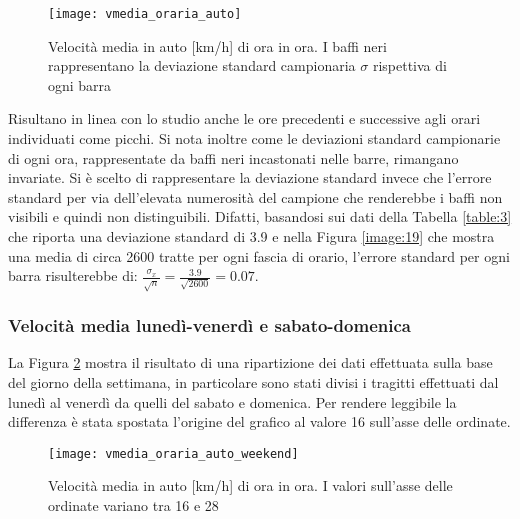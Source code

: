 \begin{figure}[H]
	\centering
	\texttt{[image: vmedia\_oraria\_auto]}
	\caption{Velocità media in auto [km/h] di ora in ora. I baffi neri rappresentano la deviazione standard campionaria $\sigma$ rispettiva di ogni barra}
	\label{image:3}
\end{figure}

Risultano in linea con lo studio anche le ore precedenti e successive agli orari individuati come picchi. Si nota inoltre come le deviazioni standard campionarie di ogni ora, rappresentate da baffi neri incastonati nelle barre, rimangano invariate. Si è scelto di rappresentare la deviazione standard invece che l'errore standard per via dell'elevata numerosità del campione che renderebbe i baffi non visibili e quindi non distinguibili. Difatti, basandosi sui dati della Tabella \ref{table:3} che riporta una deviazione standard di 3.9 e nella Figura \ref{image:19} che mostra una media di circa 2600 tratte per ogni fascia di orario, l'errore standard per ogni barra risulterebbe di: $\frac{\sigma_x}{\sqrt{n}} = \frac{3.9}{\sqrt{2600}} = 0.07$.

\subsubsection{Velocità media lunedì-venerdì e sabato-domenica}

La Figura \ref{image:4} mostra il risultato di una ripartizione dei dati effettuata sulla base del giorno della settimana, in particolare sono stati divisi i tragitti effettuati dal lunedì al venerdì da quelli del sabato e domenica. Per rendere leggibile la differenza è stata spostata l'origine del grafico al valore 16 sull'asse delle ordinate.

\begin{figure}[H]
	\centering
	\texttt{[image: vmedia\_oraria\_auto\_weekend]}
	\caption{Velocità media in auto [km/h] di ora in ora. I valori sull'asse delle ordinate variano tra 16 e 28}
	\label{image:4}
\end{figure}

